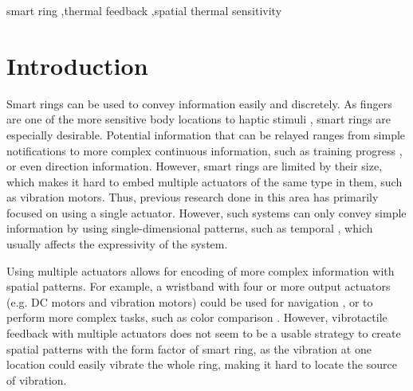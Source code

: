 \documentclass[preprint,12pt]{elsarticle}
\begin{document}
\begin{frontmatter}
\begin{keyword}
smart ring \sep thermal feedback \sep spatial thermal sensitivity



\end{keyword}

\end{frontmatter}


\section{Introduction}
Smart rings can be used to convey information easily and discretely. As fingers are one of the more sensitive body locations to haptic stimuli \cite{16}, smart rings are especially desirable. Potential information that can be relayed ranges from simple notifications to more complex continuous information, such as training progress \cite{3}, or even direction information. However, smart rings are limited by their size, which makes it hard to embed multiple actuators of the same type in them, such as vibration motors. Thus, previous research done in this area \cite{12,22} has primarily focused on using a single actuator. However, such systems can only convey simple information by using single-dimensional patterns, such as temporal \cite{25}, which usually affects the expressivity of the system.

Using multiple actuators allows for encoding of more complex information with spatial patterns. For example, a wristband with four or more output actuators (e.g. DC motors and vibration motors) could be used for navigation \cite{34}, or to perform more complex tasks, such as color comparison \cite{2}. However, vibrotactile feedback with multiple actuators does not seem to be a usable strategy to create spatial patterns with the form factor of smart ring, as the vibration at one location could easily vibrate the whole ring, making it hard to locate the source of vibration.
\end{document}
